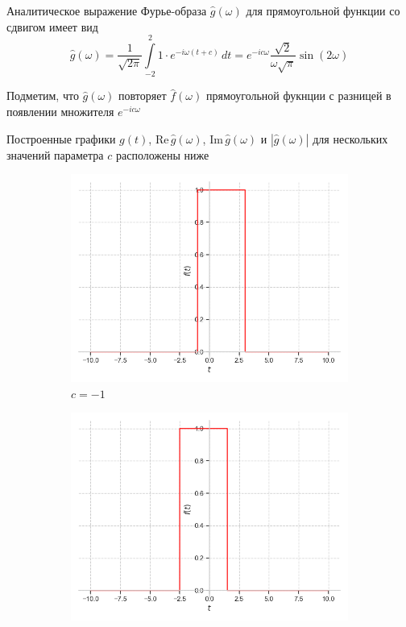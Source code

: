\documentclass[a4paper, 16pt]{article}
\begin{document}
    \noindent Аналитическое выражение Фурье-образа
    $\hat{g}(\omega)$ для прямоугольной функции со сдвигом имеет вид
    $$
    \hat{g}(\omega)=\dfrac{1}{\sqrt{2\pi}}\int\limits_{-2}^{2}1\cdot e^{-i\omega (t+c)}\,dt=
    e^{-ic\omega}\dfrac{\sqrt{2}}{\omega\sqrt{\pi}}\sin{(2\omega)}
    $$


    \noindent Подметим, что $\hat{g}(\omega)$ повторяет $\hat{f}(\omega)$ прямоугольной фукнции с разницей в появлении множителя $e^{-ic\omega}$


    \noindent Построенные графики $g(t)$, $\text{Re}\,{\hat{g}(\omega)}$,
    $\text{Im}\,{\hat{g}(\omega)}$ и $|\hat{g}(\omega)|$
    для нескольких значений параметра $c$ расположены ниже
    \begin{figure}[htbp]
        \centering
        \begin{subfigure}{0.3\textwidth}
            \centering
            \includegraphics[width=\linewidth]{sh_m1_rectf_int12.png}
            \caption{$c=-1$}
            \label{fig:shrectf_1}
        \end{subfigure}
        \hfill
        \begin{subfigure}{0.3\textwidth}
            \centering
            \includegraphics[width=\linewidth]{sh_zp5_rectf_int12.png}

\end{subfigure}
\end{figure}
\end{document}
